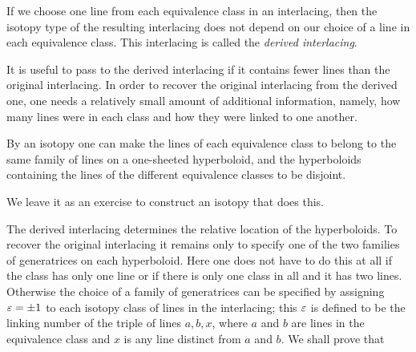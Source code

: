 \documentclass{article}
\begin{document}
If we choose one line from each equivalence class in an interlacing, then the
isotopy type of the resulting interlacing does not depend on our 
choice of a line in each equivalence class. 
This interlacing is called the {\em
derived interlacing\/}.

It is useful to pass to the derived interlacing if it contains 
fewer lines than
the original interlacing. 
In order to recover the original interlacing from the
derived one, one needs a relatively small amount of additional information,
namely, how many lines were in each class and how they were linked to one
another. 

\begin{Th} By an isotopy one can make the lines of each 
equivalence class to belong  
to the same family of lines on a one-sheeted hyperboloid, and the
hyperboloids containing the lines of the different equivalence classes 
to be disjoint. 
\end{Th} 

We leave it as an exercise to construct an isotopy that does this.

The derived interlacing determines the relative location of the hyperboloids.
To recover the original interlacing it remains only to specify one of the two
families of generatrices on each hyperboloid. 
Here one does not have to do this
at all if the class has only one line or if there is only one class in 
all and
it has two lines. Otherwise the choice of a family of generatrices can be
specified by assigning $\varepsilon=\pm1$ to each isotopy 
class
of lines in the interlacing; this $\varepsilon$ is defined to be the linking 
number of
the triple of lines $a,b,x$, where $a$ and $b$ are lines in the equivalence
class and $x$ is any line distinct from $a$ and $b$. 
We shall prove that 
\end{document}
